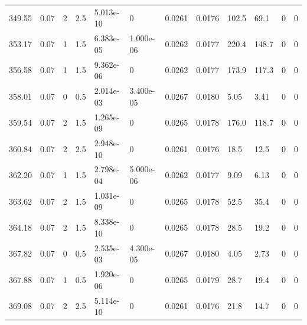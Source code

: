 \documentclass[preview]{standalone}
\begin{document}
{{{{{{\begin{tabular}{L{1.2cm}C{1.2cm} C{0.3cm}C{0.5cm} C{1.4cm}C{1.4cm} C{1.4cm}C{1.4cm} C{1.6cm}C{1.6cm} C{1.6cm}C{1.6cm}}
  349.55  &  0.07  & 2     & 2.5 &  5.013e-10  & 0  &  0.0261&   0.0176& 102.5 & 69.1   &  0 & 0  \\ 
  353.17  &  0.07  & 1     & 1.5 &  6.383e-05  & 1.000e-06  &  0.0262&   0.0177& 220.4 & 148.7   &  0 & 0  \\ 
  356.58  &  0.07  & 1     & 1.5 &  9.362e-06  & 0  &  0.0262&   0.0177& 173.9 & 117.3   &  0 & 0  \\ 
  358.01  &  0.07  & 0     & 0.5 &  2.014e-03  & 3.400e-05  &  0.0267&   0.0180& 5.05 & 3.41   &  0 & 0  \\ 
  359.54  &  0.07  & 2     & 1.5 &  1.265e-09  & 0  &  0.0265&   0.0178& 176.0 & 118.7   &  0 & 0  \\ 
  360.84  &  0.07  & 2     & 2.5 &  2.948e-10  & 0  &  0.0261&   0.0176& 18.5 & 12.5   &  0 & 0  \\ 
  362.20  &  0.07  & 1     & 1.5 &  2.798e-04  & 5.000e-06  &  0.0262&   0.0177& 9.09 & 6.13   &  0 & 0  \\ 
  363.62  &  0.07  & 2     & 1.5 &  1.031e-09  & 0  &  0.0265&   0.0178& 52.5 & 35.4   &  0 & 0  \\ 
  364.18  &  0.07  & 2     & 1.5 &  8.338e-10  & 0  &  0.0265&   0.0178& 28.5 & 19.2   &  0 & 0  \\ 
  367.82  &  0.07  & 0     & 0.5 &  2.535e-03  & 4.300e-05  &  0.0267&   0.0180& 4.05 & 2.73   &  0 & 0  \\ 
  367.88  &  0.07  & 1     & 0.5 &  1.920e-06  & 0  &  0.0265&   0.0179& 28.7 & 19.4   &  0 & 0  \\ 
  369.08  &  0.07  & 2     & 2.5 &  5.114e-10  & 0  &  0.0261&   0.0176& 21.8 & 14.7   &  0 & 0  \\ 
\hline 
\end{tabular} 

}}}}}}
\end{document}
